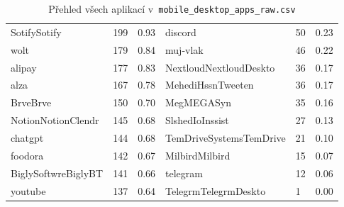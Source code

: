 \begin{table}[h!]
\begin{tabular}{llllll}
		SotifySotify        & 199             & 0.93                 & discord                 & 50              & 0.23                 \\
		wolt                & 179             & 0.84                 & muj-vlak                & 46              & 0.22                 \\
		alipay              & 177             & 0.83                 & NextloudNextloudDeskto  & 36              & 0.17                 \\
		alza                & 167             & 0.78                 & MehediHssnTweeten       & 36              & 0.17                 \\
		BrveBrve            & 150             & 0.70                 & MegMEGASyn              & 35              & 0.16                 \\
		NotionNotionClendr  & 145             & 0.68                 & SlshedIoInssist         & 27              & 0.13                 \\
		chatgpt             & 144             & 0.68                 & TemDriveSystemsTemDrive & 21              & 0.10                 \\
		foodora             & 142             & 0.67                 & MilbirdMilbird          & 15              & 0.07                 \\
		BiglySoftwreBiglyBT & 141             & 0.66                 & telegram                & 12              & 0.06                 \\
		youtube             & 137             & 0.64                 & TelegrmTelegrmDeskto    & 1               & 0.00                 \\
		\bottomrule
	\end{tabular}
	\caption{Přehled všech aplikací v~\texttt{mobile\_desktop\_apps\_raw.csv}}
	\label{tab:mobile-apps-appendix}
\end{table}
\newpage
